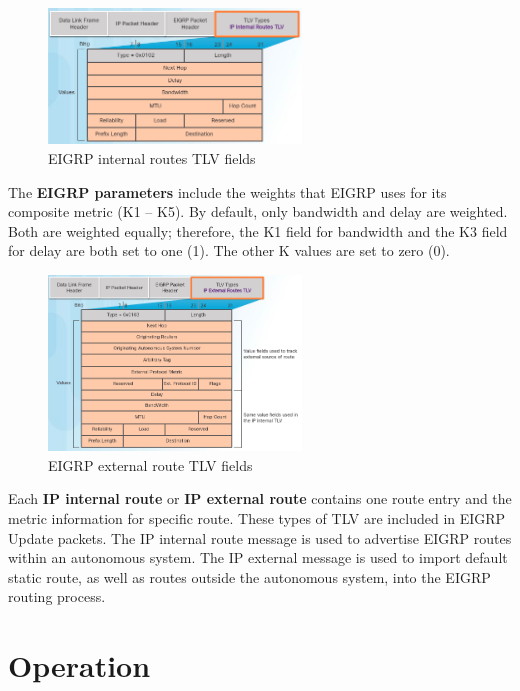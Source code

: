 \begin{figure}[hbtp]
\centering
\includegraphics[width=0.6\textwidth]{pictures/EIGRP-internal-route.png}
\caption{EIGRP internal routes TLV fields} \label{EIGRP-internal-route}
\end{figure}

The \textbf{EIGRP parameters} include the weights that EIGRP uses for its composite metric (K1 -- K5). By default, only bandwidth and delay are weighted. Both are weighted equally; therefore, the K1 field for bandwidth and the K3 field for delay are both set to one (1). The other K values are set to zero (0).\\

\begin{figure}[hbtp]
\centering
\includegraphics[width=0.6\textwidth]{pictures/EIGRP-external-route.png}
\caption{EIGRP external route TLV fields} \label{EIGRP-external-route}
\end{figure}
 
Each \textbf{IP internal route} or \textbf{IP external route} contains one route entry and the metric information for specific route. These types of TLV are included in EIGRP Update packets. The IP internal route message is used to advertise EIGRP routes within an autonomous system. The IP external message is used to import default static route, as well as routes outside the autonomous system, into the EIGRP routing process.
 
\section{Operation}

